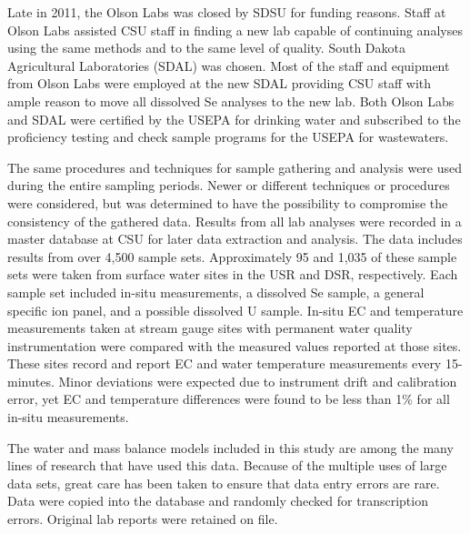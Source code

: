 Late in 2011, the Olson Labs was closed by SDSU for funding reasons.  Staff at Olson Labs assisted CSU staff in finding a new lab capable of continuing analyses using the same methods and to the same level of quality.  South Dakota Agricultural Laboratories (SDAL) was chosen.  Most of the staff and equipment from Olson Labs were employed at the new SDAL providing CSU staff with ample reason to move all dissolved Se analyses to the new lab.  Both Olson Labs and SDAL were certified by the USEPA for drinking water and subscribed to the proficiency testing and check sample programs for the USEPA for wastewaters.

The same procedures and techniques for sample gathering and analysis were used during the entire sampling periods.  Newer or different techniques or procedures were considered, but was determined to have the possibility to compromise the consistency of the gathered data.  Results from all lab analyses were recorded in a master database at CSU for later data extraction and analysis.  The data includes results from over 4,500 sample sets.  Approximately 95 and 1,035 of these sample sets were taken from surface water sites in the USR and DSR, respectively.  Each sample set included in-situ measurements, a dissolved Se sample, a general specific ion panel, and a possible dissolved U sample.  In-situ EC and temperature measurements taken at stream gauge sites with permanent water quality instrumentation were compared with the measured values reported at those sites.  These sites record and report EC and water temperature measurements every 15-minutes.  Minor deviations were expected due to instrument drift and calibration error, yet EC and temperature differences were found to be less than 1\% for all in-situ measurements.

The water and mass balance models included in this study are among the many lines of research that have used this data.  Because of the multiple uses of large data sets, great care has been taken to ensure that data entry errors are rare.  Data were copied into the database and randomly checked for transcription errors.  Original lab reports were retained on file.

\clearpage{}
